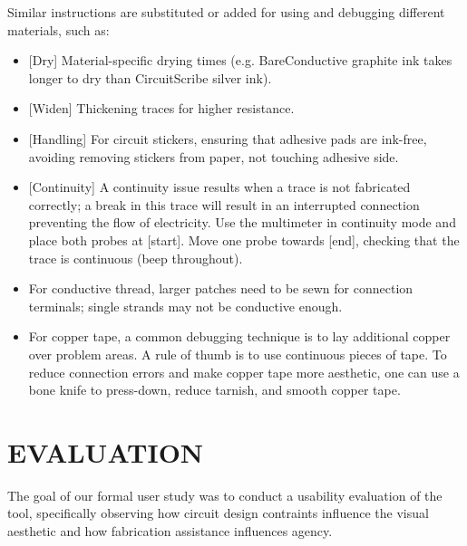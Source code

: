 \documentclass{sigchi}
\begin{document}
        Similar instructions are substituted or added for using and debugging different materials, such as:
        \begin{itemize}   
          \item {[}Dry{]} Material-specific drying times (e.g. BareConductive graphite ink takes longer to dry than CircuitScribe silver ink). 
          \item {[}Widen{]} Thickening traces for higher resistance. 
          \item {[}Handling{]} For circuit stickers, ensuring that adhesive pads are ink-free, avoiding removing stickers from paper, not touching adhesive side. %
          \item {[}Continuity{]} A continuity issue results when a trace is not fabricated correctly; a break in this trace will result in an interrupted connection preventing the flow of electricity. Use the multimeter in continuity mode and place both probes at [start]. Move one probe towards [end], checking that the trace is continuous (beep throughout).  
          \item For conductive thread, larger patches need to be sewn for connection terminals; single strands may not be conductive enough. 
          \item For copper tape, a common debugging technique is to lay additional copper over problem areas. A rule of thumb is to use continuous pieces of tape. To reduce connection errors and make copper tape more aesthetic, one can use a bone knife to press-down, reduce tarnish, and smooth copper tape. 
        \end{itemize}

\section{EVALUATION}
    The goal of our formal user study was to conduct a usability evaluation of the tool, specifically observing how circuit design contraints influence the visual aesthetic and how fabrication assistance influences agency. 
\end{document}

